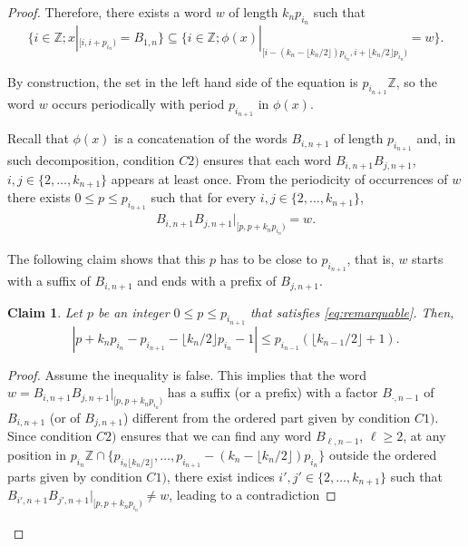 \documentclass{daj}
\theoremstyle{plain}
\newtheorem{claim}[theorem]{Claim}
\theoremstyle{definition}
\begin{document}
\begin{proof}
	Therefore, there exists a word $w$ of length $k_{n}p_{i_{n}}$ such that
	\begin{equation*}\label{eq:extunique}
	\{ i \in \mathbb{Z} ; x|_{[i, i+p_{i_{n}})} =  B_{1,n}  \} \subseteq  \{ i \in \mathbb{Z}; \phi(x)|_{[i-(k_{n} - \lfloor k_{n}/2 \rfloor)p_{i_{n}}, i+\lfloor k_{n}/2 \rfloor p_{i_{n}})} = w\}.
	\end{equation*}
	
	By construction, the set in  the left hand side of the equation is $p_{i_{n+1}}\mathbb{Z}$, so the word $w$ occurs periodically with period $p_{i_{n+1}}$ in $\phi(x)$.  
	
	Recall that $\phi(x) $ is a  concatenation of the words $B_{i,n+1}$  of length $p_{i_{n+1}}$ and, in such decomposition, condition $C2)$ ensures that each word $B_{i,n+1}B_{j,n+1}$, $i,j \in \{2,\ldots,k_{n+1}\}$ appears at least once.
	From the periodicity of  occurrences of $w$ there exists $0 \le p \le p_{i_{n+1}}$ such that for every $i,j\in \{2, \ldots, k_{n+1}\}$,
	\begin{eqnarray}\label{eq:remarquable}
	B_{i,n+1}B_{j,n+1}|_{[p, p +k_{n}p_{i_{n}})} = w.   
	\end{eqnarray}
	
	The following claim shows that this $p$ has to be close to $p_{i_{n+1}}$, that is, $w$ starts with a suffix of $B_{i,n+1}$ and ends with a prefix of $B_{j,n+1}$. 
	
	\begin{claim}\label{lem:combinatoire2}
		Let $p$ be an  integer $0 \le p \le p_{i_{n+1}}$ that  satisfies \eqref{eq:remarquable}. 
		Then, $$\left | p+k_{n}p_{i_{n}}  -p_{i_{n+1}}  - \lfloor k_{n}/2 \rfloor  p_{i_{n}} -1 \right | \le p_{i_{n-1}}(\lfloor k_{n-1}/2 \rfloor +1).$$
	\end{claim}
	\begin{proof}
		Assume the inequality is false. This implies that the word $w =  B_{i,n+1}B_{j,n+1}|_{[p, p+k_{n}p_{i_{n}})}$ has a suffix (or a prefix) with  a factor $B_{\cdot, n-1}$   of $B_{i,n+1}$ (or of $B_{j,n+1}$)  different from the  ordered part  given by condition $C1)$. Since condition $C2)$ ensures that we can find any word $B_{\ell, n-1}$, $\ell \ge 2$,  at any position in $p_{i_{n}} \mathbb{Z} \cap \{p_{i_{n} \lfloor  k_{n} /2\rfloor }, \dots, p_{i_{n+1}}- (k_{n}- \lfloor  k_{n} /2\rfloor)p_{i_{n}}\}$ outside the ordered parts given by condition $C1)$, there exist indices $i',j' \in  \{2, \ldots , k_{n+1}\}$ such that 
		$ B_{i',n+1}B_{j',n+1}|_{[p, p+k_{n}p_{i_{n}})} \neq w$, leading to a contradiction 
	\end{proof}
	

\end{proof}
\end{document}
